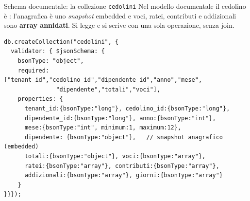 \documentclass[aspectratio=169,11pt]{beamer}
\begin{document}
\begin{frame}[fragile]{Schema documentale: la collezione \texttt{cedolini}}
  \small Nel modello documentale il cedolino è : l'anagrafica è uno \emph{snapshot} embedded e voci, ratei, contributi e addizionali sono \textbf{array annidati}. 
  Si legge e si scrive con una sola operazione, senza join.
  \vspace{0.1em}
  \begin{lstlisting}[basicstyle=\ttfamily\scriptsize,aboveskip=2pt,belowskip=2pt]
db.createCollection("cedolini", {
  validator: { $jsonSchema: {
    bsonType: "object",
    required: ["tenant_id","cedolino_id","dipendente_id","anno","mese",
               "dipendente","totali","voci"],
    properties: {
      tenant_id:{bsonType:"long"}, cedolino_id:{bsonType:"long"},
      dipendente_id:{bsonType:"long"}, anno:{bsonType:"int"},
      mese:{bsonType:"int", minimum:1, maximum:12},
      dipendente: {bsonType:"object"},   // snapshot anagrafico (embedded)
      totali:{bsonType:"object"}, voci:{bsonType:"array"},
      ratei:{bsonType:"array"}, contributi:{bsonType:"array"},
      addizionali:{bsonType:"array"}, giorni:{bsonType:"array"}
    }
}}});
  \end{lstlisting}
\end{frame}
\end{document}
